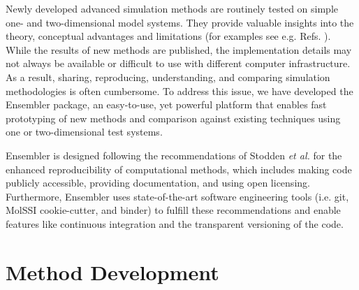 Newly developed advanced simulation methods are routinely tested on simple one- and two-dimensional model systems. They provide valuable insights into the theory, conceptual advantages and limitations (for examples see e.g. Refs. \cite{Huber1994, Laio2002, Christ2007, Konig2012a, Koenig2020, Donnini2016, Weiß2016, Lemke2018}).
While the results of new methods are published, the implementation details may not always be available or difficult to use with different computer infrastructure.
As a result, sharing, reproducing, understanding, and comparing simulation methodologies is often cumbersome.\cite{Peng2011}
To address this issue, we have developed the Ensembler package, an easy-to-use, yet powerful platform that enables fast prototyping of new methods and comparison against existing techniques using one or two-dimensional test systems.

Ensembler is designed following the recommendations of Stodden \textit{et al.}\cite{Stodden2016} for the enhanced reproducibility of computational methods, which includes making code publicly accessible, providing documentation, and using open licensing.\cite{Stodden2016} 
Furthermore, Ensembler uses state-of-the-art software engineering tools (i.e. git,\cite{Chacon2014} MolSSI cookie-cutter,\cite{Naden2018} and binder\cite{JupyterBinder2018}) to fulfill these recommendations and enable features like continuous integration and the transparent versioning of the code. 

\section{Method Development}

